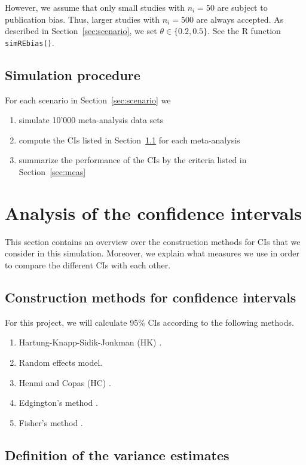 \documentclass[letterpaper, 12pt]{article}
\begin{document}
However, we assume that only small studies with $n_i = 50$ are subject to
publication bias. Thus, larger studies with $n_i = 500$ are always accepted.
As described in Section~\ref{sec:scenario}, we set $\theta \in \{0.2, 0.5\}$.
See the R function \texttt{simREbias()}.

\subsection{Simulation procedure}
For each scenario in Section~\ref{sec:scenario} we
\begin{enumerate}
\item simulate 10'000 meta-analysis data sets
\item compute the CIs listed in Section~\ref{sec:method} for each meta-analysis
\item summarize the performance of the CIs by the criteria listed in
  Section~\ref{sec:meas}
\end{enumerate}

\section{Analysis of the confidence intervals} \label{sec:analysis}

This section contains an overview over the construction methods for CIs
that we consider in this simulation. Moreover, we explain what measures we
use in order to compare the different CIs with each other.

\subsection{Construction methods for confidence intervals} \label{sec:method}

For this project, we will calculate 95\% CIs according to the following methods.

\begin{enumerate}
  \item Hartung-Knapp-Sidik-Jonkman (HK) \citep{IntHoutIoannidis}.
  \item Random effects model.
  \item Henmi and Copas (HC) \citep{henm:copa:10}.
  \item Edgington's method \citep{edgington:72}.
  \item Fisher's method \citep{fisher:34}.
\end{enumerate}

\subsection{Definition of the variance estimates} \label{sec:varadj}
\end{document}
